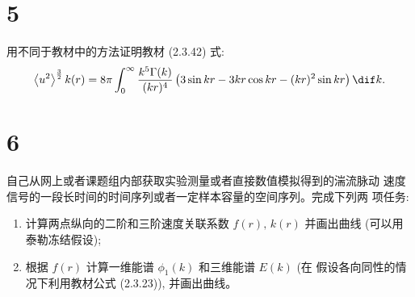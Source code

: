 \documentclass[12pt,a4]{ctexart}
\begin{document}
\section{5}

用不同于教材中的方法证明教材 (2.3.42) 式:
\begin{equation}
   \left\langle u^{2}\right\rangle^{\frac{3}{2}} k(r)=8 \pi \int_{0}^{\infty} \frac{k^{5} \Gamma(k)}{(k r)^{4}}\left(3 \sin k r-3 k r \cos k r-(k r)^{2} \sin k r\right)\dif k.
\end{equation}

\section{6}

自己从网上或者课题组内部获取实验测量或者直接数值模拟得到的湍流脉动 速度信号的一段长时间的时间序列或者一定样本容量的空间序列。完成下列两 项任务:
\begin{enumerate}
   \item 计算两点纵向的二阶和三阶速度关联系数 $f(r),\, k(r)$ 并画出曲线 (可以用泰勒冻结假设);
   \item 根据 $f(r)$ 计算一维能谱 $\phi_{1}(k)$ 和三维能谱 $E(k)$ (在 假设各向同性的情况下利用教材公式 (2.3.23)), 并画出曲线。
\end{enumerate}







\end{document}
